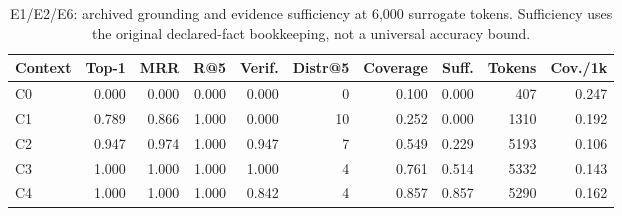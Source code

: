 \begin{table}[t]
\centering\footnotesize
\caption{E1/E2/E6: archived grounding and evidence sufficiency at 6,000 surrogate tokens. Sufficiency uses the original declared-fact bookkeeping, not a universal accuracy bound.}
\label{tab:archive-context}
\setlength{\tabcolsep}{3.5pt}
\begin{tabular}{@{}lrrrrrrrrr@{}}
\toprule
Context & Top-1 & MRR & R@5 & Verif. & Distr@5 & Coverage & Suff. & Tokens & Cov./1k \\
\midrule
C0 & 0.000 & 0.000 & 0.000 & 0.000 & 0 & 0.100 & 0.000 & 407 & 0.247 \\
C1 & 0.789 & 0.866 & 1.000 & 0.000 & 10 & 0.252 & 0.000 & 1310 & 0.192 \\
C2 & 0.947 & 0.974 & 1.000 & 0.947 & 7 & 0.549 & 0.229 & 5193 & 0.106 \\
C3 & 1.000 & 1.000 & 1.000 & 1.000 & 4 & 0.761 & 0.514 & 5332 & 0.143 \\
C4 & 1.000 & 1.000 & 1.000 & 0.842 & 4 & 0.857 & 0.857 & 5290 & 0.162 \\
\bottomrule
\end{tabular}
\end{table}
